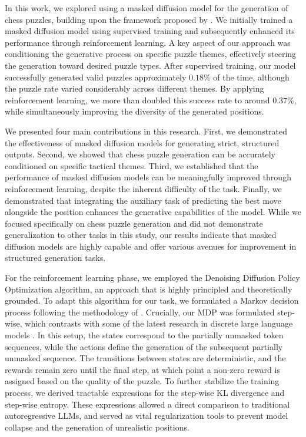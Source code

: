In this work, we explored using a masked diffusion model for the generation of chess puzzles, building upon the framework proposed by \citeauthor{feng2025generatingcreativechesspuzzles}. We initially trained a masked diffusion model using supervised training and subsequently enhanced its performance through reinforcement learning. A key aspect of our approach was conditioning the generative process on specific puzzle themes, effectively steering the generation toward desired puzzle types. After supervised training, our model successfully generated valid puzzles approximately $0.18\%$ of the time, although the puzzle rate varied considerably across different themes. By applying reinforcement learning, we more than doubled this success rate to around $0.37\%$, while simultaneously improving the diversity of the generated positions.

We presented four main contributions in this research. First, we demonstrated the effectiveness of masked diffusion models for generating strict, structured outputs. Second, we showed that chess puzzle generation can be accurately conditioned on specific tactical themes. Third, we established that the performance of masked diffusion models can be meaningfully improved through reinforcement learning, despite the inherent difficulty of the task. Finally, we demonstrated that integrating the auxiliary task of predicting the best move alongside the position enhances the generative capabilities of the model. While we focused specifically on chess puzzle generation and did not demonstrate generalization to other tasks in this study, our results indicate that masked diffusion models are highly capable and offer various avenues for improvement in structured generation tasks.

For the reinforcement learning phase, we employed the Denoising Diffusion Policy Optimization algorithm, an approach that is highly principled and theoretically grounded. To adapt this algorithm for our task, we formulated a Markov decision process following the methodology of \citeauthor{black2024trainingdiffusionmodelsreinforcement}. Crucially, our MDP was formulated step-wise, which contrasts with some of the latest research in discrete large language models \cite{ou2025principledrldiffusionllms, rojas2025improvingreasoningdiffusionlanguage}. In this setup, the states correspond to the partially unmasked token sequences, while the actions define the generation of the subsequent partially unmasked sequence. The transitions between states are deterministic, and the rewards remain zero until the final step, at which point a non-zero reward is assigned based on the quality of the puzzle. To further stabilize the training process, we derived tractable expressions for the step-wise KL divergence and step-wise entropy. These expressions allowed a direct comparison to traditional autoregressive LLMs, and served as vital regularization tools to prevent model collapse and the generation of unrealistic positions.

